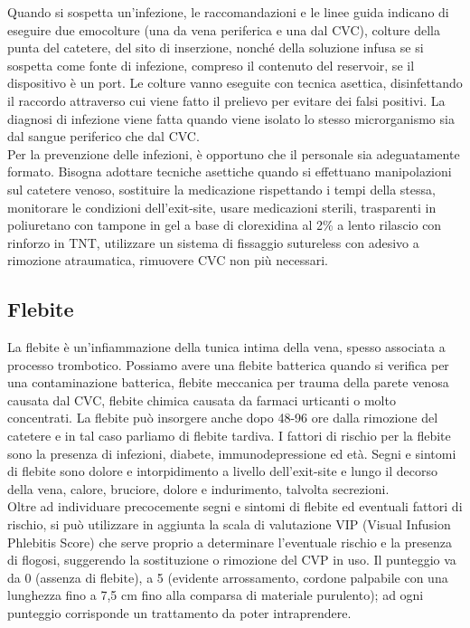 Quando si sospetta un’infezione, le raccomandazioni e le linee guida indicano di eseguire due emocolture 
(una da vena periferica e una dal CVC), colture della punta del catetere, del sito di inserzione, nonché della 
soluzione infusa se si sospetta come fonte di infezione, compreso il contenuto del reservoir, se il dispositivo è un 
port. Le colture vanno eseguite con tecnica asettica, disinfettando il raccordo attraverso cui viene fatto il 
prelievo per evitare dei falsi positivi. La diagnosi di infezione viene fatta quando viene isolato lo stesso 
microrganismo sia dal sangue periferico che dal CVC\cite{AIOMCVC}.\\
Per la prevenzione delle infezioni, è opportuno che il personale sia adeguatamente formato. Bisogna adottare tecniche 
asettiche quando si effettuano manipolazioni sul catetere venoso, sostituire la medicazione rispettando i tempi della 
stessa, monitorare le condizioni dell’exit-site, usare medicazioni sterili, trasparenti in poliuretano con tampone 
in gel a base di clorexidina al 2\% a lento rilascio con rinforzo in TNT, utilizzare un sistema di fissaggio 
sutureless con adesivo a rimozione atraumatica, rimuovere CVC non più necessari\cite{AIOMCVC}.\\

\subsection{Flebite}

La flebite è un’infiammazione della tunica intima della vena, spesso associata a processo trombotico. 
Possiamo avere una flebite batterica quando si verifica per una contaminazione batterica, flebite meccanica per 
trauma della parete venosa causata dal CVC, flebite chimica causata da farmaci urticanti o molto concentrati. 
La flebite può insorgere anche dopo 48-96 ore dalla rimozione del catetere e in tal caso parliamo di flebite tardiva. 
I fattori di rischio per la flebite sono la presenza di infezioni, diabete, immunodepressione ed età. 
Segni e sintomi di flebite sono dolore e intorpidimento a livello dell’exit-site e lungo il decorso della vena, 
calore, bruciore, dolore e indurimento, talvolta secrezioni\cite{AIOMCVC}.\\
Oltre ad individuare precocemente segni e sintomi di flebite ed eventuali fattori di rischio, si può utilizzare 
in aggiunta la scala di valutazione VIP (Visual Infusion Phlebitis Score) che serve proprio a determinare l'eventuale 
rischio e la presenza di flogosi, suggerendo la sostituzione o rimozione del CVP in uso. Il punteggio va da 0 
(assenza di flebite), a 5 (evidente arrossamento, cordone palpabile con una lunghezza fino a 7,5 cm 
fino alla comparsa di materiale purulento); ad ogni punteggio corrisponde un trattamento da poter intraprendere\cite{FNOPIRIVISTA}.

